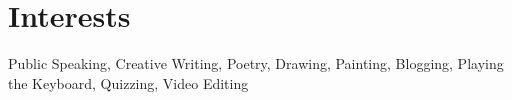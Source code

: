 \documentclass[12pt,a4paper,roman]{moderncv}        %
\begin{document}
\section{\small{Interests}}
Public Speaking, Creative Writing, Poetry, Drawing, Painting, Blogging, Playing the Keyboard, Quizzing, Video Editing



%


\clearpage
\end{document}
